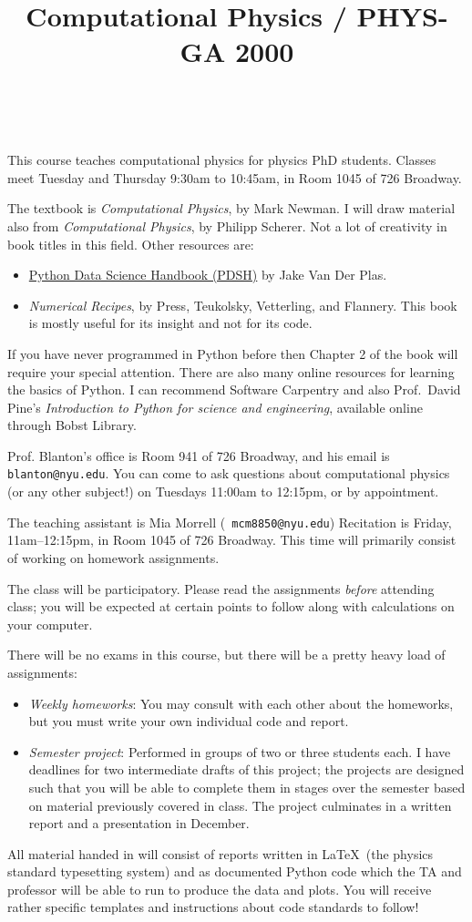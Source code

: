 \documentclass[11pt, preprint]{aastex}
\begin{document}
\title{\bf Computational Physics / PHYS-GA 2000}
~
~

\noindent This course teaches computational physics for physics PhD
students. Classes meet Tuesday and Thursday 9:30am to 10:45am, in Room
1045 of 726 Broadway.

\noindent The textbook is {\it Computational Physics}, by Mark
Newman. I will draw material also from {\it Computational Physics}, by
Philipp Scherer. Not a lot of creativity in book titles in this
field. Other resources are:
\begin{itemize}
\item
  \href{https://jakevdp.github.io/PythonDataScienceHandbook/}{Python
    Data Science Handbook (PDSH)} by Jake Van Der Plas.
\item {\it Numerical Recipes}, by Press, Teukolsky, Vetterling, and
  Flannery. This book is mostly useful for its insight and not for its
  code.
\end{itemize}

\noindent If you have never programmed in Python before then Chapter 2
of the book will require your special attention. There are also many
online resources for learning the basics of Python. I can recommend
Software Carpentry and also Prof.~David Pine's {\it Introduction to
  Python for science and engineering}, available online through Bobst
Library.

\noindent Prof. Blanton's office is Room 941 of 726 Broadway, and his
email is {\tt blanton@nyu.edu}. You can come to ask questions about
computational physics (or any other subject!) on Tuesdays 11:00am to
12:15pm, or by appointment.

\noindent The teaching assistant is Mia Morrell ({\tt
  mcm8850@nyu.edu}) Recitation is Friday, 11am--12:15pm, in Room 1045
of 726 Broadway. This time will primarily consist of working on
homework assignments.

\noindent The class will be participatory. Please read the assignments
          {\it before} attending class; you will be expected at
          certain points to follow along with calculations on your
          computer.

\noindent There will be no exams in this course, but there will be a
pretty heavy load of assignments:
\begin{itemize}
\item {\it Weekly homeworks}: You may consult with each other about
  the homeworks, but you must write your own individual code and
  report.
\item {\it Semester project}: Performed in groups of two or three
  students each. I have deadlines for two intermediate drafts of this
  project; the projects are designed such that you will be able to
  complete them in stages over the semester based on material
  previously covered in class. The project culminates in a written
  report and a presentation in December.
\end{itemize}
All material handed in will consist of reports written in \LaTeX\ (the
physics standard typesetting system) and as documented Python code
which the TA and professor will be able to run to produce the data and
plots. You will receive rather specific templates and instructions
about code standards to follow!
\end{document}
